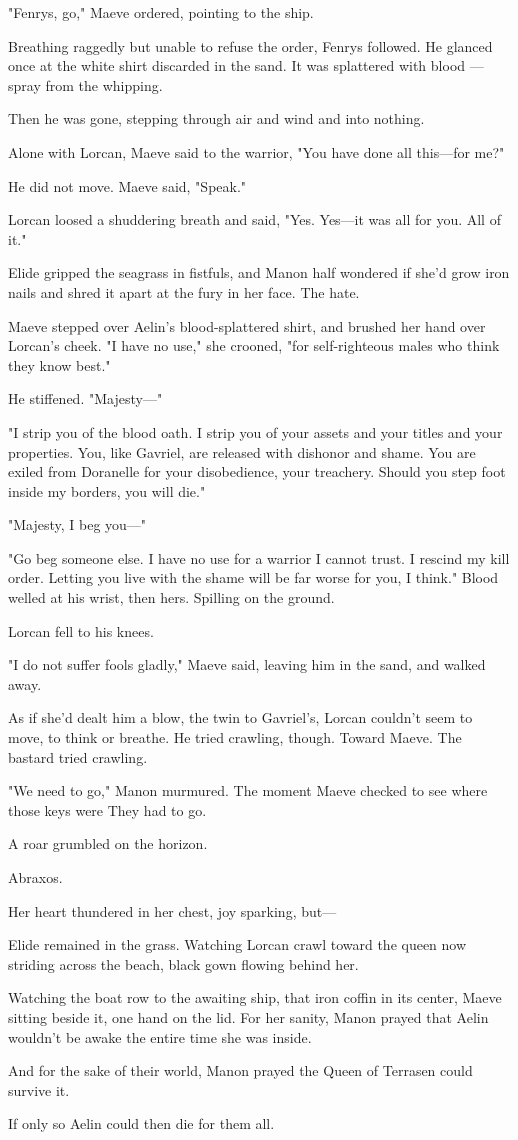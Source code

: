 "Fenrys, go," Maeve ordered, pointing to the ship.

Breathing raggedly but unable to refuse the order, Fenrys followed. He glanced once at the white shirt discarded in the sand. It was splattered with blood ---spray from the whipping.

Then he was gone, stepping through air and wind and into nothing.

Alone with Lorcan, Maeve said to the warrior, "You have done all this---for me?"

He did not move. Maeve said, "Speak."

Lorcan loosed a shuddering breath and said, "Yes. Yes---it was all for you. All of it."

Elide gripped the seagrass in fistfuls, and Manon half wondered if she'd grow iron nails and shred it apart at the fury in her face. The hate.

Maeve stepped over Aelin's blood-splattered shirt, and brushed her hand over Lorcan's cheek. "I have no use," she crooned, "for self-righteous males who think they know best."

He stiffened. "Majesty---"

"I strip you of the blood oath. I strip you of your assets and your titles and your properties. You, like Gavriel, are released with dishonor and shame. You are exiled from Doranelle for your disobedience, your treachery. Should you step foot inside my borders, you will die."

"Majesty, I beg you---"

"Go beg someone else. I have no use for a warrior I cannot trust. I rescind my kill order. Letting you live with the shame will be far worse for you, I think." Blood welled at his wrist, then hers. Spilling on the ground.

Lorcan fell to his knees.

"I do not suffer fools gladly," Maeve said, leaving him in the sand, and walked away.

As if she'd dealt him a blow, the twin to Gavriel's, Lorcan couldn't seem to move, to think or breathe. He tried crawling, though. Toward Maeve. The bastard tried crawling.

"We need to go," Manon murmured. The moment Maeve checked to see where those keys were  They had to go.

A roar grumbled on the horizon.

Abraxos.

Her heart thundered in her chest, joy sparking, but---

Elide remained in the grass. Watching Lorcan crawl toward the queen now striding across the beach, black gown flowing behind her.

Watching the boat row to the awaiting ship, that iron coffin in its center, Maeve sitting beside it, one hand on the lid. For her sanity, Manon prayed that Aelin wouldn't be awake the entire time she was inside.

And for the sake of their world, Manon prayed the Queen of Terrasen could survive it.

If only so Aelin could then die for them all.
